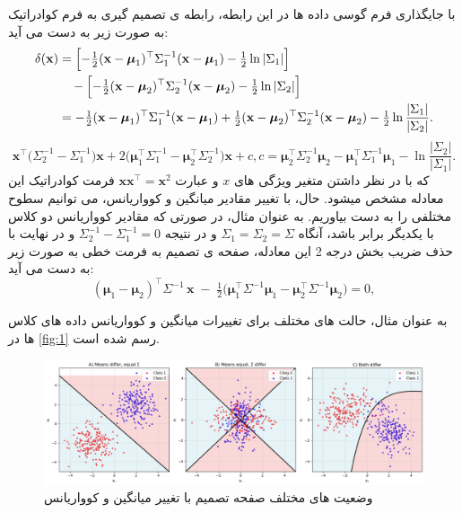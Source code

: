 \documentclass{article}
\begin{document}
با جایگذاری فرم گوسی داده ها در این رابطه، رابطه ی تصمیم گیری به فرم کوادراتیک به صورت زیر به دست می آید:
\begin{equation}
	\begin{aligned}
		\delta(\mathbf{x})
		&=\Bigl[-\tfrac12(\mathbf{x}-\boldsymbol\mu_1)^\top\Sigma_1^{-1}(\mathbf{x}-\boldsymbol\mu_1)
		-\tfrac12\ln|\Sigma_1|\Bigr]\\
		&\quad -\Bigl[-\tfrac12(\mathbf{x}-\boldsymbol\mu_2)^\top\Sigma_2^{-1}(\mathbf{x}-\boldsymbol\mu_2)
		-\tfrac12\ln|\Sigma_2|\Bigr]\\
		&=-\tfrac12(\mathbf{x}-\boldsymbol\mu_1)^\top\Sigma_1^{-1}(\mathbf{x}-\boldsymbol\mu_1)
		+\tfrac12(\mathbf{x}-\boldsymbol\mu_2)^\top\Sigma_2^{-1}(\mathbf{x}-\boldsymbol\mu_2)
		-\tfrac12\ln\frac{|\Sigma_1|}{|\Sigma_2|}.
	\end{aligned}
\end{equation}
\begin{equation}
	\mathbf{x}^\top\bigl(\Sigma_2^{-1}-\Sigma_1^{-1}\bigr)\mathbf{x}
	+2\bigl(\boldsymbol\mu_1^\top\Sigma_1^{-1}-\boldsymbol\mu_2^\top\Sigma_2^{-1}\bigr)\mathbf{x}
	+c
	, 
	c=\boldsymbol\mu_2^\top\Sigma_2^{-1}\boldsymbol\mu_2
	-\boldsymbol\mu_1^\top\Sigma_1^{-1}\boldsymbol\mu_1
	-\ln\frac{|\Sigma_2|}{|\Sigma_1|}.
\end{equation}
که با در نظر داشتن متغیر ویژگی های $x$ و عبارت $\mathbf{x} \mathbf{x}^\top = \mathbf{x}^2
$ فرمت کوادراتیک این معادله مشخص میشود. حال، با تغییر مقادیر میانگین و کوواریانس، می توانیم سطوح مختلفی را به دست بیاوریم. به عنوان مثال، در صورتی که مقادیر کوواریانس دو کلاس با یکدیگر برابر باشد، آنگاه $\Sigma_1=\Sigma_2=\Sigma$ و در نتیجه $\Sigma_2^{-1}-\Sigma_1^{-1}=0$ و در نهایت با حذف ضریب بخش درجه 2 این معادله، صفحه ی تصمیم به فرمت خطی به صورت زیر به دست می آید:
\begin{equation}
	(\boldsymbol\mu_1-\boldsymbol\mu_2)^\top\Sigma^{-1}\,\mathbf{x}
	\;-\;\tfrac12\bigl(\boldsymbol\mu_1^\top\Sigma^{-1}\boldsymbol\mu_1
	-\boldsymbol\mu_2^\top\Sigma^{-1}\boldsymbol\mu_2\bigr)
	=0,
\end{equation}

به عنوان مثال، حالت های مختلف برای تغییرات میانگین و کوواریانس داده های کلاس ها در 
\autoref{fig:1}
رسم شده است.
\begin{figure}[h!]
	\centering
	\includegraphics[width=1\linewidth]{1}
	\caption{وضعیت های مختلف صفحه تصمیم با تغییر میانگین و کوواریانس}
	\label{fig:1}
\end{figure}
\end{document}
